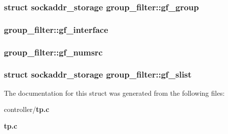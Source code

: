 \subsubsection[{gf\_\-group}]{\setlength{\rightskip}{0pt plus 5cm}struct {\bf sockaddr\_\-storage} {\bf group\_\-filter::gf\_\-group}}\label{structgroup__filter_a1a6696077c35e575117abeac30443fc7}
\subsubsection[{gf\_\-interface}]{ {\bf group\_\-filter::gf\_\-interface}}\label{structgroup__filter_a46de97a261ce94d8fce3f752bf92f59b}
\subsubsection[{gf\_\-numsrc}]{ {\bf group\_\-filter::gf\_\-numsrc}}\label{structgroup__filter_ada812ae2398a4976c762baa7d377a1de}
\subsubsection[{gf\_\-slist}]{\setlength{\rightskip}{0pt plus 5cm}struct {\bf sockaddr\_\-storage} {\bf group\_\-filter::gf\_\-slist}}\label{structgroup__filter_a0ac1f620ab5b119108fcd3362da93796}


The documentation for this struct was generated from the following files:\begin{DoxyCompactItemize}
\item 
controller/{\bf tp.c}\item 
{\bf tp.c}\end{DoxyCompactItemize}

